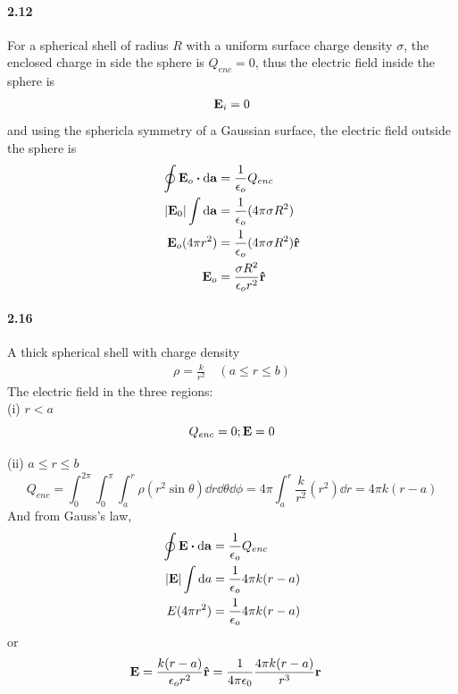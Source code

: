 \documentclass[../main.tex]{subfiles}
\begin{document}
\paragraph{2.12}
For a spherical shell of radius $R$ with a uniform surface charge density $\sigma$, the enclosed
charge in side the sphere is $Q_{enc} = 0$, thus the electric field inside the sphere is 
\begin{align*}
    \vb{E}_i = 0
\end{align*}
and using the sphericla symmetry of a Gaussian surface, the electric field outside the sphere is
\begin{align*}
    \oint \vb{E}_o \vdot \dd{\vb{a}} &= \frac{1}{\epsilon_o} Q_{enc} \\
    \abs{\vb{E}_0} \int \dd{\vb{a}} &= \frac{1}{\epsilon_o} (4\pi\sigma R^2) \\
    \vb{E}_o (4\pi r^2) &= \frac{1}{\epsilon_o} (4\pi\sigma R^2) \vu{r} \\
    \vb{E}_o &= \frac{\sigma R^2}{\epsilon_o r^2} \vu{r}
\end{align*}

\newpage
\paragraph{2.16} \label{hw:2_16}
A thick spherical shell with charge density
\begin{align*}
    \rho = \frac{k}{r^2} \quad (a\leq r \leq b)
\end{align*}
The electric field in the three regions: \\
(i) \(r<a\)
\[ Q_{enc} = 0; \vb{E} = 0 \]

(ii) \(a\leq r \leq b\)
\[ Q_{enc} = \int_0^{2\pi} \int_0^\pi \int_a^r \rho (r^2 \sin\theta) \dd{r} \dd{\theta} \dd{\phi}
= 4\pi \int_a^r \frac{k}{r^2} (r^2) \dd{r} = 4\pi k (r - a) \]
And from Gauss's law,
\begin{align*}
    \oint \vb{E} \vdot \dd{\vb{a}} &= \frac{1}{\epsilon_o} Q_{enc} \\
    \abs{\vb{E}} \int \dd{a} &= \frac{1}{\epsilon_o} 4\pi k (r - a) \\
    E (4\pi r^2) &= \frac{1}{\epsilon_o} 4\pi k (r - a)
\end{align*}
or 
\begin{align*}
    \vb{E} &= \frac{k (r - a)}{\epsilon_o r^2} \vu{r} = \frac{1}{4\pi\epsilon_0} \frac{4\pi k(r - a)}{r^3} \vb{r}
\end{align*}
\end{document}
